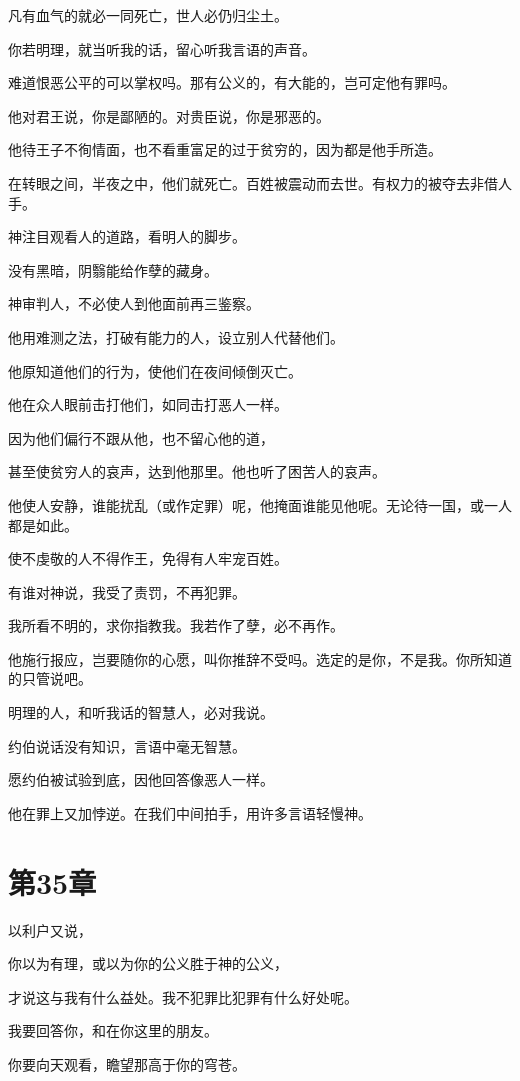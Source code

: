 \documentclass[12pt,oneside]{book}
\begin{document}
凡有血气的就必一同死亡，世人必仍归尘土。

你若明理，就当听我的话，留心听我言语的声音。

难道恨恶公平的可以掌权吗。那有公义的，有大能的，岂可定他有罪吗。

他对君王说，你是鄙陋的。对贵臣说，你是邪恶的。

他待王子不徇情面，也不看重富足的过于贫穷的，因为都是他手所造。

在转眼之间，半夜之中，他们就死亡。百姓被震动而去世。有权力的被夺去非借人手。

神注目观看人的道路，看明人的脚步。

没有黑暗，阴翳能给作孽的藏身。

神审判人，不必使人到他面前再三鉴察。

他用难测之法，打破有能力的人，设立别人代替他们。

他原知道他们的行为，使他们在夜间倾倒灭亡。

他在众人眼前击打他们，如同击打恶人一样。

因为他们偏行不跟从他，也不留心他的道，

甚至使贫穷人的哀声，达到他那里。他也听了困苦人的哀声。

他使人安静，谁能扰乱（或作定罪）呢，他掩面谁能见他呢。无论待一国，或一人都是如此。

使不虔敬的人不得作王，免得有人牢宠百姓。

有谁对神说，我受了责罚，不再犯罪。

我所看不明的，求你指教我。我若作了孽，必不再作。

他施行报应，岂要随你的心愿，叫你推辞不受吗。选定的是你，不是我。你所知道的只管说吧。

明理的人，和听我话的智慧人，必对我说。

约伯说话没有知识，言语中毫无智慧。

愿约伯被试验到底，因他回答像恶人一样。

他在罪上又加悖逆。在我们中间拍手，用许多言语轻慢神。


\chapter{第35章}
以利户又说，

你以为有理，或以为你的公义胜于神的公义，

才说这与我有什么益处。我不犯罪比犯罪有什么好处呢。

我要回答你，和在你这里的朋友。

你要向天观看，瞻望那高于你的穹苍。
\end{document}
